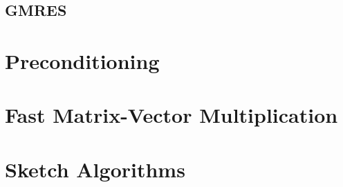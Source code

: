 \subsection{GMRES}

\section{Preconditioning}

\section{Fast Matrix-Vector Multiplication}

\section{Sketch Algorithms}

